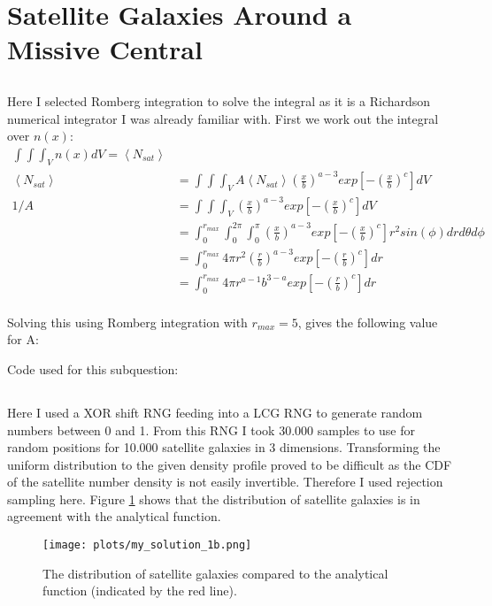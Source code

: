\section{Satellite Galaxies Around a Missive Central}

\subsection{}
Here I selected Romberg integration to solve the integral as it is a Richardson numerical integrator I was already familiar with.
First we work out the integral over $n(x)$:
\begin{align}
    \int \int \int _V n(x) dV = \left< N_{sat} \right>\\
    \left< N_{sat} \right> &= \int \int \int _V A \left< N_{sat} \right> \left( \frac{x}{b} \right)^{a-3} exp\left[-\left(\frac{x}{b}\right)^c\right] dV \\
    1 / A &= \int \int \int _V \left( \frac{x}{b} \right)^{a-3} exp\left[-\left(\frac{x}{b}\right)^c\right] dV \\
    &= \int_0^{r_{max}} \int_0^{2 \pi} \int_0^{\pi} \left( \frac{x}{b} \right)^{a-3} exp\left[-\left(\frac{x}{b}\right)^c\right] r^2 sin(\phi) dr d\theta d\phi \\
    &= \int_0^{r_{max}} 4 \pi r^2 \left( \frac{r}{b} \right)^{a-3} exp\left[-\left(\frac{r}{b}\right)^c\right] dr \\
    &= \int_0^{r_{max}} 4 \pi r^{a-1} b^{3-a} exp\left[-\left(\frac{r}{b}\right)^c\right] dr \\
\end{align}

Solving this using Romberg integration with $r_{max}=5$, gives the following value for A:

\noindent
Code used for this subquestion:



\subsection{}
Here I used a XOR shift RNG feeding into a LCG RNG to generate random numbers between 0 and 1.
From this RNG I took 30.000 samples to use for random positions for 10.000 satellite galaxies in 3 dimensions.
Transforming the uniform distribution to the given density profile proved to be difficult as the CDF of the satellite number density is not easily invertible.
Therefore I used rejection sampling here.
Figure \ref{fig:1b} shows that the distribution of satellite galaxies is in agreement with the analytical function.
\begin{figure}[h]
    \centering
    \texttt{[image: plots/my\_solution\_1b.png]}
    \caption{The distribution of satellite galaxies compared to the analytical function (indicated by the red line).}
    \label{fig:1b}
\end{figure}

